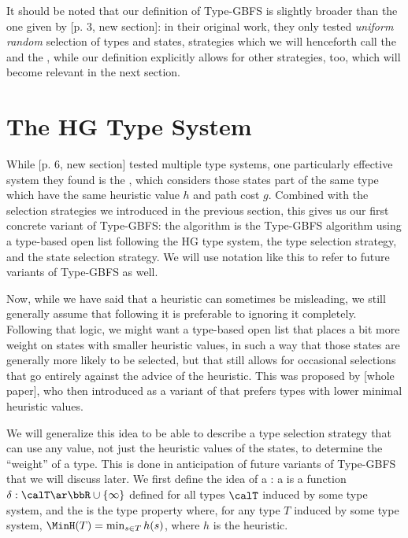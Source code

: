 
It should be noted that our definition of Type-GBFS is slightly broader than the one given by [p. 3, new section]: in their original work, they only tested \emph{uniform random} selection of types and states, strategies which we will henceforth call the  and the , while our definition explicitly allows for other strategies, too, which will become relevant in the next section.

\section{The HG Type System}
\label{sec:hg}

While [p. 6, new section] tested multiple type systems, one particularly effective system they found is the , which considers those states part of the same type which have the same heuristic value $h$ and path cost $g$. Combined with the selection strategies we introduced in the previous section, this gives us our first concrete variant of Type-GBFS: the \kw{\hgUu} algorithm is the Type-GBFS algorithm using a type-based open list following the HG type system, the \Utss type selection strategy, and the \Usss state selection strategy. We will use notation like this to refer to future variants of Type-GBFS as well.

Now, while we have said that a heuristic can sometimes be misleading, we still generally assume that following it is preferable to ignoring it completely. Following that logic, we might want a type-based open list that places a bit more weight on states with smaller heuristic values, in such a way that those states are generally more likely to be selected, but that still allows for occasional selections that go entirely against the advice of the heuristic. This was proposed by [whole paper], who then introduced  as a variant of \hgUu that prefers types with lower minimal heuristic values.

We will generalize this idea to be able to describe a type selection strategy that can use any value, not just the heuristic values of the states, to determine the ``weight'' of a type. This is done in anticipation of future variants of Type-GBFS that we will discuss later. We first define the idea of a : a  is a function $\delta:\calT\ar\bbR\cup\{\infty\}$ defined for all types $\calT$ induced by some type system, and the  is the type property where, for any type $T$ induced by some type system, $\MinH(T)=\min_{s\in T}h(s)$, where $h$ is the heuristic.

